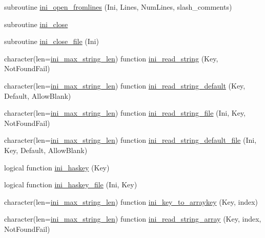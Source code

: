 \begin{DoxyCompactItemize}
\item 
subroutine \mbox{\hyperlink{namespaceinifile_aaece0286cd984aadae94bf1212d74f9f}{ini\+\_\+open\+\_\+fromlines}} (Ini, Lines, Num\+Lines, slash\+\_\+comments)
\item 
subroutine \mbox{\hyperlink{namespaceinifile_a78d82ad0d3252c4a2d546ee63b37b9b4}{ini\+\_\+close}}
\item 
subroutine \mbox{\hyperlink{namespaceinifile_a3e8c87d124e33f36146deccd416a2cc1}{ini\+\_\+close\+\_\+file}} (Ini)
\item 
character(len=\mbox{\hyperlink{namespaceinifile_a32faebf83b580d14b5af965dcb4eebfd}{ini\+\_\+max\+\_\+string\+\_\+len}}) function \mbox{\hyperlink{namespaceinifile_a3e13a763ec2647b0a011c509a529ffbf}{ini\+\_\+read\+\_\+string}} (Key, Not\+Found\+Fail)
\item 
character(len=\mbox{\hyperlink{namespaceinifile_a32faebf83b580d14b5af965dcb4eebfd}{ini\+\_\+max\+\_\+string\+\_\+len}}) function \mbox{\hyperlink{namespaceinifile_aa7ae8cf26934154dd70639ba1ed9d541}{ini\+\_\+read\+\_\+string\+\_\+default}} (Key, Default, Allow\+Blank)
\item 
character(len=\mbox{\hyperlink{namespaceinifile_a32faebf83b580d14b5af965dcb4eebfd}{ini\+\_\+max\+\_\+string\+\_\+len}}) function \mbox{\hyperlink{namespaceinifile_a83d64e9da5ab1119c623d180ebefa77f}{ini\+\_\+read\+\_\+string\+\_\+file}} (Ini, Key, Not\+Found\+Fail)
\item 
character(len=\mbox{\hyperlink{namespaceinifile_a32faebf83b580d14b5af965dcb4eebfd}{ini\+\_\+max\+\_\+string\+\_\+len}}) function \mbox{\hyperlink{namespaceinifile_a7af43d0285b9f48d8082252153920a68}{ini\+\_\+read\+\_\+string\+\_\+default\+\_\+file}} (Ini, Key, Default, Allow\+Blank)
\item 
logical function \mbox{\hyperlink{namespaceinifile_a72c6fee616d03391492c7f2722f12ca8}{ini\+\_\+haskey}} (Key)
\item 
logical function \mbox{\hyperlink{namespaceinifile_afa65465f4a06b9d51b12e74038f77132}{ini\+\_\+haskey\+\_\+file}} (Ini, Key)
\item 
character(len=\mbox{\hyperlink{namespaceinifile_a32faebf83b580d14b5af965dcb4eebfd}{ini\+\_\+max\+\_\+string\+\_\+len}}) function \mbox{\hyperlink{namespaceinifile_a41a20dc9e9ec4315613c4e3c23108f2e}{ini\+\_\+key\+\_\+to\+\_\+arraykey}} (Key, index)
\item 
character(len=\mbox{\hyperlink{namespaceinifile_a32faebf83b580d14b5af965dcb4eebfd}{ini\+\_\+max\+\_\+string\+\_\+len}}) function \mbox{\hyperlink{namespaceinifile_af85df5c619b25702ba2acfebf00f3c60}{ini\+\_\+read\+\_\+string\+\_\+array}} (Key, index, Not\+Found\+Fail)

\end{DoxyCompactItemize}

